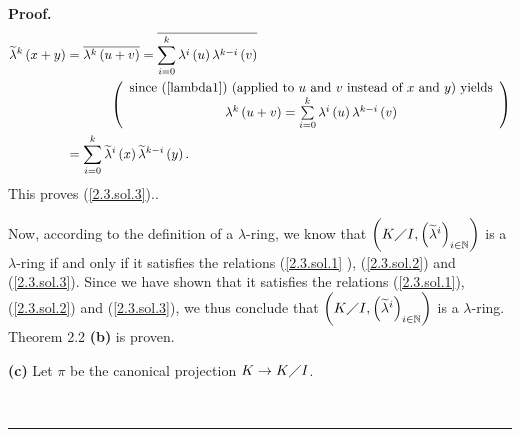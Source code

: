 \documentclass[numbers=enddot,12pt,final,onecolumn,notitlepage]{scrartcl}%
\newenvironment{proof}[1][Proof]{\noindent\textbf{#1.} }{\ \rule{0.5em}{0.5em}}
\begin{document}
\begin{proof}
{\begin{align*}
\widetilde{\lambda}^{k}\left(  x+y\right)   &  =\overline{\lambda^{k}\left(
u+v\right)  }=\overline{\sum_{i=0}^{k}\lambda^{i}\left(  u\right)
\lambda^{k-i}\left(  v\right)  }\\
&  \ \ \ \ \ \ \ \ \ \ \left(
\begin{array}
[c]{c}%
\text{since (\ref{lambda1}) (applied to }u\text{ and }v\text{ instead of
}x\text{ and }y\text{) yields}\\
\lambda^{k}\left(  u+v\right)  =\sum\limits_{i=0}^{k}\lambda^{i}\left(
u\right)  \lambda^{k-i}\left(  v\right)
\end{array}
\right) \\
&  =\sum_{i=0}^{k}\widetilde{\lambda}^{i}\left(  x\right)  \widetilde{\lambda
}^{k-i}\left(  y\right)  .
\end{align*}
This proves (\ref{2.3.sol.3}).}.

Now, according to the definition of a $\lambda$-ring, we know that $\left(
K\diagup I,\left(  \widetilde{\lambda}^{i}\right)  _{i\in\mathbb{N}}\right)  $
is a $\lambda$-ring if and only if it satisfies the relations (\ref{2.3.sol.1}%
), (\ref{2.3.sol.2}) and (\ref{2.3.sol.3}). Since we have shown that it
satisfies the relations (\ref{2.3.sol.1}), (\ref{2.3.sol.2}) and
(\ref{2.3.sol.3}), we thus conclude that $\left(  K\diagup I,\left(
\widetilde{\lambda}^{i}\right)  _{i\in\mathbb{N}}\right)  $ is a $\lambda
$-ring. Theorem 2.2 \textbf{(b)} is proven.

\textbf{(c)} Let $\pi$ be the canonical projection $K\rightarrow K\diagup I$.


\end{proof}
\end{document}

